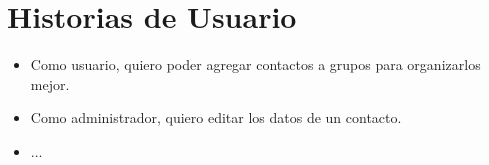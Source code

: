 \chapter{Historias de Usuario}

\begin{itemize}
    \item Como usuario, quiero poder agregar contactos a grupos para organizarlos mejor.
    \item Como administrador, quiero editar los datos de un contacto.
    \item ...
\end{itemize}

